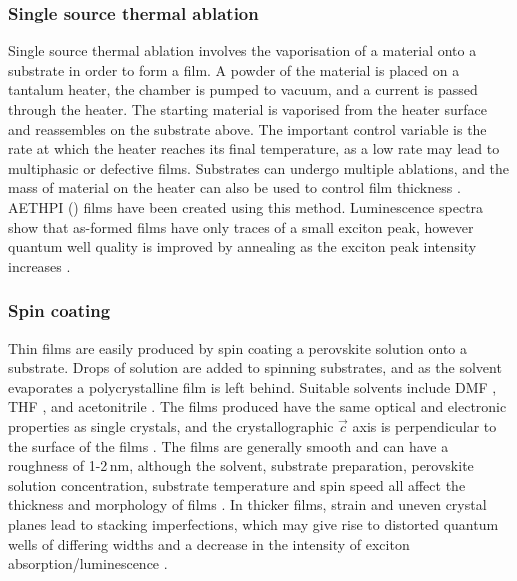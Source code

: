 \subsubsection{Single source thermal ablation}
Single source thermal ablation involves the vaporisation of a material onto a substrate in order to form a film. A powder of the material is placed on a tantalum heater, the chamber is pumped to vacuum, and a current is passed through the heater. The starting material is vaporised from the heater surface and reassembles on the substrate above. The important control variable is the rate at which the heater reaches its final temperature, as a low rate may lead to multiphasic or defective films. Substrates can undergo multiple ablations, and the mass of material on the heater can also be used to control film thickness \cite{Mitzi1999}. AETHPI () films have been created using this method. Luminescence spectra show that as-formed films have only traces of a small exciton peak, however quantum well quality is improved by annealing as the exciton peak intensity increases \cite{Chondroudis2000}.

\subsubsection{Spin coating}
\label{sec:spin}
Thin films are easily produced by spin coating a perovskite solution onto a substrate. Drops of solution are added to spinning substrates, and as the solvent evaporates a polycrystalline film is left behind. Suitable solvents include DMF \cite{Kikuchi2005}, THF \cite{Kataoka1994}, and acetonitrile \cite{VijayaPrakash2009}. The films produced have the same optical and electronic properties as single crystals, and the crystallographic $\vec{c}$ axis is perpendicular to the surface of the films \cite{Kataoka1993}. The films are generally smooth and can have a roughness of 1-2\,nm, although the solvent, substrate preparation, perovskite solution concentration, substrate temperature and spin speed all affect the thickness and morphology of films \cite{Mitzi2001b}. In thicker films, strain and uneven crystal planes lead to stacking imperfections, which may give rise to distorted quantum wells of differing widths and a decrease in the intensity of exciton absorption/luminescence \cite{VijayaPrakash2009}.

